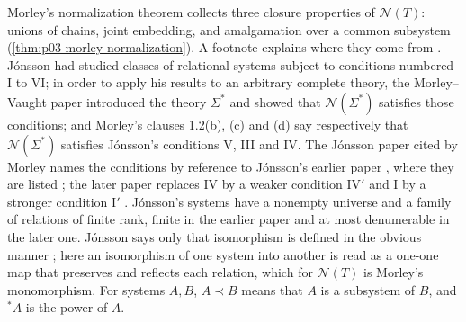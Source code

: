 Morley's normalization theorem collects three closure properties of
\(\mathcal N(T)\): unions of chains, joint embedding, and amalgamation over
a common subsystem (\cref{thm:p03-morley-normalization}). A footnote
explains where they come from \cite[p.~517, n.~5]{Morley1965}. Jónsson
had studied classes of relational systems subject to conditions numbered
I to VI; in order to apply his results to an arbitrary complete theory,
the Morley--Vaught paper introduced the theory \(\Sigma^*\) and showed
that \(\mathcal N(\Sigma^*)\) satisfies those conditions; and Morley's
clauses 1.2(b), (c) and (d) say respectively that \(\mathcal N(\Sigma^*)\)
satisfies Jónsson's conditions V, III and IV. The Jónsson paper cited by
Morley names the conditions by reference to Jónsson's earlier paper
\cite[pp.~137--138]{Jonsson1960}, where they are listed
\cite[p.~195]{Jonsson1956}; the later paper replaces IV by a weaker
condition IV\('\) and I by a stronger condition I\('\)
\cite[pp.~137--138]{Jonsson1960}. Jónsson's systems have a nonempty
universe and a family of relations of finite rank, finite in the earlier
paper and at most denumerable in the later one. Jónsson says only that
isomorphism is defined in the obvious manner \cite[p.~194]{Jonsson1956};
here an isomorphism of one system into another is read as a one-one map
that preserves and reflects each relation, which for \(\mathcal N(T)\) is
Morley's monomorphism. For
systems \(A,B\), \(A\prec B\) means that \(A\) is a subsystem of \(B\),
and \(^*A\) is the power of \(A\).


